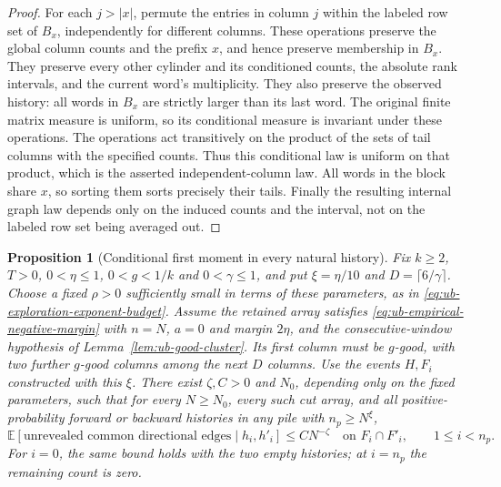 \documentclass[11pt]{article}
\numberwithin{equation}{section}
\newtheorem{proposition}[proposition]{Proposition}
\newcommand{\E}{\mathbb E}
\newcommand{\1}{\mathbf 1}
\begin{document}
\begin{proof}
For each \(j>|x|\), permute the entries in column \(j\) within
the labeled row set of \(B_x\), independently for different
columns. These operations preserve the global column counts and
the prefix \(x\), and hence preserve membership in \(B_x\).
They preserve every other cylinder and its conditioned counts,
the absolute rank intervals, and the current word's multiplicity.
They also preserve the observed history: all words in \(B_x\)
are strictly larger than its last word. The original finite matrix
measure is uniform, so its conditional measure is invariant under
these operations. The operations act transitively on the product
of the sets of tail columns with the specified counts. Thus this
conditional law is uniform on that product, which is the asserted
independent-column law. All words in the block share \(x\), so
sorting them sorts precisely their tails. Finally the resulting
internal graph law depends only on the induced counts and the
interval, not on the labeled row set being averaged out.
\end{proof}

\begin{proposition}[Conditional first moment in every natural history]
\label{lem:ub-conditional-first-moment}
Fix $k\ge2$, $T>0$, $0<\eta\le1$, $0<g<1/k$ and
$0<\gamma\le1$, and put $\xi=\eta/10$ and $D=\lceil6/\gamma\rceil$.
Choose a fixed $\rho>0$ sufficiently small in terms of these parameters,
as in \eqref{eq:ub-exploration-exponent-budget}. Assume the retained
array satisfies \eqref{eq:ub-empirical-negative-margin} with $n=N$,
$a=0$ and margin $2\eta$, and the consecutive-window hypothesis of
Lemma~\ref{lem:ub-good-cluster}. Its first column must be $g$-good,
with two further $g$-good columns among the next $D$ columns.
Use the events $H,F_i$ constructed with this $\xi$.
There exist $\zeta,C>0$ and $N_0$, depending only on the fixed
parameters, such that for every $N\ge N_0$, every such cut array,
and all positive-probability forward or backward histories in any
pile with $n_p\ge N^\xi$,
\begin{equation}
\label{eq:ub-actual-conditional-remaining}
 \E[\text{unrevealed common directional edges}\mid h_i,h'_i]
 \le C N^{-\zeta}
 \quad\text{on }F_i\cap F'_i,\qquad 1\le i<n_p.
\end{equation}
For \(i=0\), the same bound holds with the two empty histories;
at \(i=n_p\) the remaining count is zero.
\end{proposition}
\end{document}
